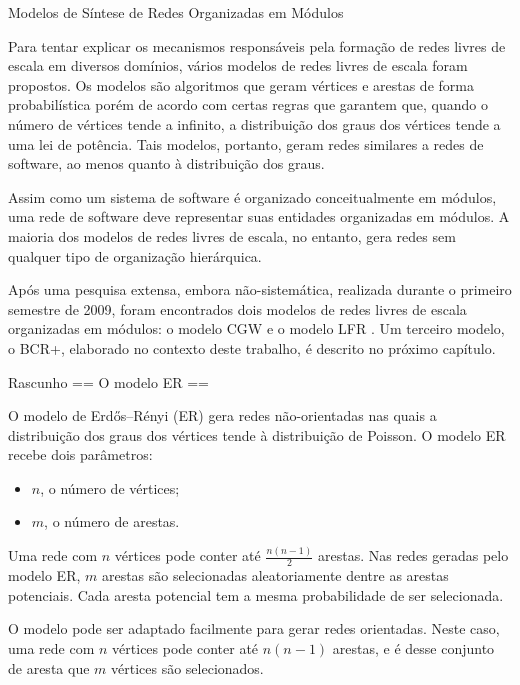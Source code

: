 \begin{section}{Modelos de Síntese de Redes Organizadas em Módulos}

Para tentar explicar os mecanismos responsáveis pela formação de redes livres de escala em diversos domínios, vários modelos de redes livres de escala foram propostos. Os modelos são algoritmos que geram vértices e arestas de forma probabilística porém de acordo com certas regras que garantem que, quando o número de vértices tende a infinito, a distribuição dos graus dos vértices tende a uma lei de potência. Tais modelos, portanto, geram redes similares a redes de software, ao menos quanto à distribuição dos graus.

Assim como um sistema de software é organizado conceitualmente em módulos, uma rede de software deve representar suas entidades organizadas em módulos. A maioria dos modelos de redes livres de escala, no entanto, gera redes sem qualquer tipo de organização hierárquica.

Após uma pesquisa extensa, embora não-sistemática, realizada durante o primeiro semestre de 2009, foram encontrados dois modelos de redes livres de escala organizadas em módulos: o modelo CGW \cite{Chen2008} e o modelo LFR \cite{Lancichinetti2008,Lancichinetti2009}. Um terceiro modelo, o BCR+, elaborado no contexto deste trabalho, é descrito no próximo capítulo.


\begin{subsection}{Rascunho}
	== O modelo ER ==
	
	O modelo de Erdős–Rényi (ER) gera redes não-orientadas nas quais a distribuição dos graus dos vértices tende à distribuição de Poisson. O modelo ER recebe dois parâmetros:
	
	\begin{itemize}
		\item $n$, o número de vértices;
		\item $m$, o número de arestas.
	\end{itemize}
	
	Uma rede com $n$ vértices pode conter até $\frac{n(n-1)}{2}$ arestas. Nas redes geradas pelo modelo ER, $m$ arestas são selecionadas aleatoriamente dentre as arestas potenciais. Cada aresta potencial tem a mesma probabilidade de ser selecionada.
	
	O modelo pode ser adaptado facilmente para gerar redes orientadas. Neste caso, uma rede com $n$ vértices pode conter até $n(n-1)$ arestas, e é desse conjunto de aresta que $m$ vértices são selecionados.
	

\end{subsection}
\end{section}
